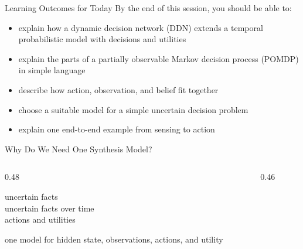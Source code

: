\documentclass[aspectratio=169]{beamer}
\begin{document}
\begin{frame}{Learning Outcomes for Today}
By the end of this session, you should be able to:
\begin{itemize}
  \item explain how a dynamic decision network (DDN) extends a temporal probabilistic model with decisions and utilities
  \item explain the parts of a partially observable Markov decision process (POMDP) in simple language
  \item describe how action, observation, and belief fit together
  \item choose a suitable model for a simple uncertain decision problem
  \item explain one end-to-end example from sensing to action
\end{itemize}
\end{frame}

\begin{frame}{Why Do We Need One Synthesis Model?}
\begin{columns}[T,onlytextwidth]
  \begin{column}{0.48\textwidth}
    \begin{tcolorbox}[colback=plainbg,colframe=plainframe,boxrule=0.7pt,title=What we already have]
    \small uncertain facts\\
    uncertain facts over time\\
    actions and utilities
    \end{tcolorbox}
    \begin{tcolorbox}[colback=questionbg,colframe=questionframe,boxrule=0.7pt,title=What we still need]
    \small one model for hidden state, observations, actions, and utility
    \end{tcolorbox}
  \end{column}
  \begin{column}{0.46\textwidth}
    \begin{center}
    \end{center}
  \end{column}
\end{columns}
\end{frame}
\end{document}
